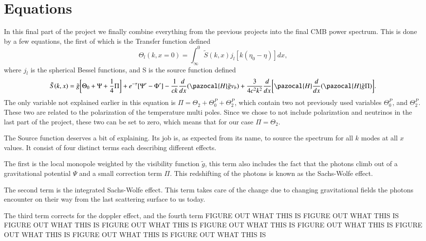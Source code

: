 \documentclass[a4paper]{report}
\begin{document}
\section{Equations}\label{sec:Equations}
In this final part of the project we finally combine everything from the previous projects into the final CMB power spectrum. This is done by a few equations, the first of which is the Transfer function defined
\begin{equation}
 \Theta_l(k,x=0)=\int^0_\infty \tilde{S}(k,x)j_l[k(\eta_0-\eta)]dx,
\end{equation}
where $j_l$ is the spherical Bessel functions, and S is the source function defined
\begin{equation}
 \tilde{S}(k,x) = \tilde{g}\bigg[\Theta_0+\Psi+\frac{1}{4}\Pi\bigg]+e^{-\tau}[\Psi^\prime-\Phi^\prime]-\frac{1}{ck}\frac{d}{dx}(\pazocal{H}\tilde{g}v_b) +\frac{3}{4c^2k^2}\frac{d}{dx}\bigg[\pazocal{H}\frac{d}{dx}(\pazocal
{H}\tilde{g}\Pi) \bigg].
\end{equation}
The only variable not explained earlier in this equation is $\Pi = \Theta_2 +\Theta_0^P+\Theta_2^P$, which contain two not previously used variables $\Theta_0^P$, and $\Theta_2^P$. These two are related to the polarization of the temperature multi poles. Since we chose to not include polarization and neutrinos in the last part of the project, these two can be set to zero, which means that for our case $\Pi = \Theta_2$.

The Source function deserves a bit of explaining. Its job is, as expected from its name, to source the spectrum for all $k$ modes at all $x$ values. It consist of four distinct terms each describing different effects. 

The first is the local monopole weighted by the visibility function $\tilde{g}$, this term also includes the fact that the photons climb out of a gravitational potential $\Psi$ and a small correction term $\Pi$. This redshifting of the photons is known as the Sachs-Wolfe effect. 

The second term is the integrated Sachs-Wolfe effect. This term takes care of the change due to changing gravitational fields the photons encounter on their way from the last scattering surface to us today.

The third term corrects for the doppler effect, and the fourth term FIGURE OUT WHAT THIS IS FIGURE OUT WHAT THIS IS FIGURE OUT WHAT THIS IS FIGURE OUT WHAT THIS IS FIGURE OUT WHAT THIS IS FIGURE OUT WHAT THIS IS FIGURE OUT WHAT THIS IS FIGURE OUT WHAT THIS IS FIGURE OUT WHAT THIS IS 
\end{document}
